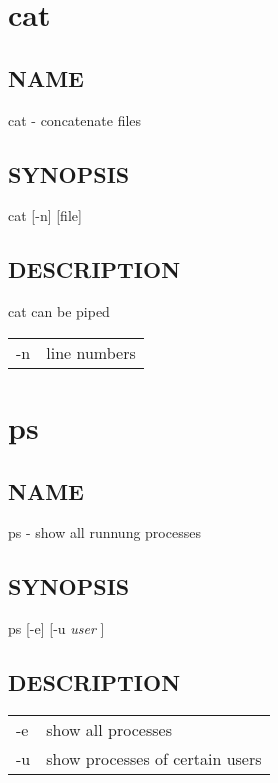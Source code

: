 \documentclass[11pt]{book}
\begin{document}
\chapter{cat}
\label{sec-1-5}
\section{NAME}
\label{sec-1-5-1}
cat - concatenate files
\section{SYNOPSIS}
\label{sec-1-5-2}
cat [-n] [file]
\section{DESCRIPTION}
\label{sec-1-5-3}
cat can be piped

\begin{center}
\begin{tabular}{ll}
-n & line numbers\\
\end{tabular}
\end{center}

\chapter{ps}
\label{sec-1-6}
\section{NAME}
\label{sec-1-6-1}
ps - show all runnung processes
\section{SYNOPSIS}
\label{sec-1-6-2}
ps [-e] [-u \emph{user} ]
\section{DESCRIPTION}
\label{sec-1-6-3}
\begin{center}
\begin{tabular}{ll}
-e & show all processes\\
-u & show processes of certain users\\
\end{tabular}
\end{center}
\end{document}
